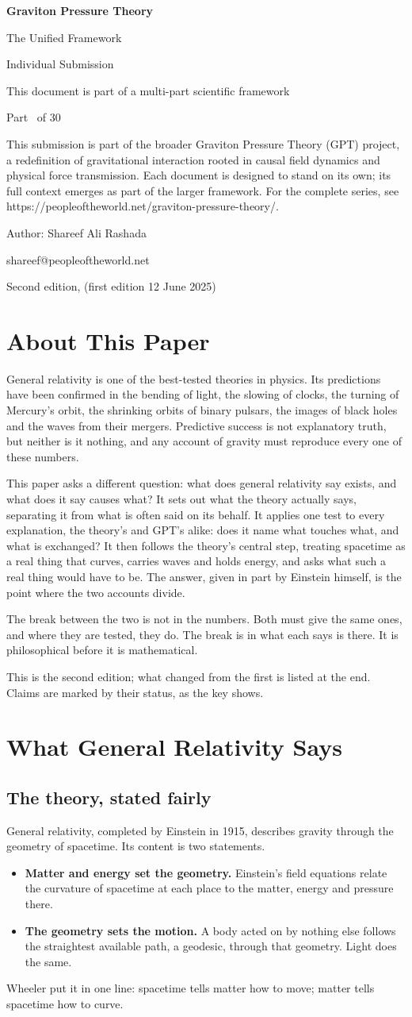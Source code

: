 \documentclass[11pt,a4paper]{article}
\makeatletter
\newcommand{\gptitle}{%
  \begin{titlepage}\centering
  \vspace*{3cm}
  {\Huge\bfseries Graviton Pressure Theory\par}\vspace{0.8cm}
  {\Large The Unified Framework\par}\vspace{0.2cm}
  {\large Individual Submission\par}\vspace{0.6cm}
  {\normalsize This document is part of a multi-part scientific framework\par}\vspace{2cm}
  {\normalsize Part \gptpart\ of 30\par}\vspace{0.8cm}
  {\huge\bfseries \gpttitle\par}\vspace{0.6cm}
  {\Large \gptsubtitle\par}\vspace{1.5cm}
  {\small\begin{minipage}{0.75\textwidth}\centering This submission is part of the broader Graviton Pressure Theory (GPT) project, a redefinition of gravitational interaction rooted in causal field dynamics and physical force transmission. Each document is designed to stand on its own; its full context emerges as part of the larger framework. For the complete series, see https://peopleoftheworld.net/graviton-pressure-theory/.\end{minipage}\par}
  \vfill
  {\large Author: Shareef Ali Rashada\par}\vspace{0.2cm}
  {\normalsize shareef@peopleoftheworld.net\par}\vspace{0.5cm}
  {\normalsize Second edition, \gptdate \quad (first edition 12 June 2025)\par}
  \end{titlepage}
  \setcounter{page}{1}\tableofcontents\clearpage}
\makeatother
\begin{document}
\gptitle

\section*{About This Paper}

General relativity is one of the best-tested theories in physics. Its predictions have been confirmed in the bending of light, the slowing of clocks, the turning of Mercury's orbit, the shrinking orbits of binary pulsars, the images of black holes and the waves from their mergers. Predictive success is not explanatory truth, but neither is it nothing, and any account of gravity must reproduce every one of these numbers.

This paper asks a different question: what does general relativity say exists, and what does it say causes what? It sets out what the theory actually says, separating it from what is often said on its behalf. It applies one test to every explanation, the theory's and GPT's alike: does it name what touches what, and what is exchanged? It then follows the theory's central step, treating spacetime as a real thing that curves, carries waves and holds energy, and asks what such a real thing would have to be. The answer, given in part by Einstein himself, is the point where the two accounts divide.

The break between the two is not in the numbers. Both must give the same ones, and where they are tested, they do. The break is in what each says is there. It is philosophical before it is mathematical.

This is the second edition; what changed from the first is listed at the end. Claims are marked by their status, as the key shows.

\statuskey

\section{What General Relativity Says}

\subsection{The theory, stated fairly}

General relativity, completed by Einstein in 1915, describes gravity through the geometry of spacetime. Its content is two statements.
\begin{itemize}
\item \textbf{Matter and energy set the geometry.} Einstein's field equations relate the curvature of spacetime at each place to the matter, energy and pressure there.
\item \textbf{The geometry sets the motion.} A body acted on by nothing else follows the straightest available path, a geodesic, through that geometry. Light does the same.
\end{itemize}
Wheeler put it in one line: spacetime tells matter how to move; matter tells spacetime how to curve.
\end{document}
